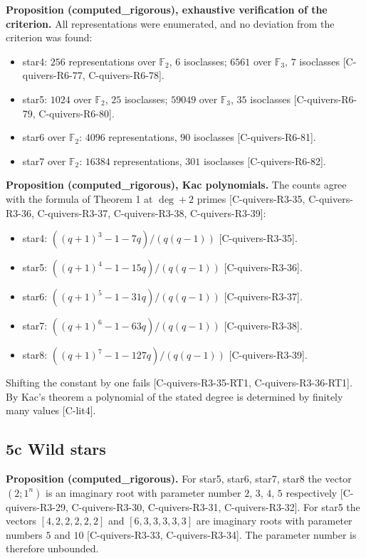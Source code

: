 \documentclass[10pt,twocolumn]{article}
\begin{document}
\textbf{Proposition (computed\_rigorous), exhaustive verification of the criterion.} All representations were enumerated, and no deviation from the criterion was found:
\begin{itemize}
\item star4: $256$ representations over $\mathbb F_2$, $6$ isoclasses; $6561$ over $\mathbb F_3$, $7$ isoclasses {\scriptsize[C-quivers-R6-77, C-quivers-R6-78]}.
\item star5: $1024$ over $\mathbb F_2$, $25$ isoclasses; $59049$ over $\mathbb F_3$, $35$ isoclasses {\scriptsize[C-quivers-R6-79, C-quivers-R6-80]}.
\item star6 over $\mathbb F_2$: $4096$ representations, $90$ isoclasses {\scriptsize[C-quivers-R6-81]}.
\item star7 over $\mathbb F_2$: $16384$ representations, $301$ isoclasses {\scriptsize[C-quivers-R6-82]}.
\end{itemize}

\textbf{Proposition (computed\_rigorous), Kac polynomials.} The counts agree with the formula of Theorem 1 at $\deg + 2$ primes {\scriptsize[C-quivers-R3-35, C-quivers-R3-36, C-quivers-R3-37, C-quivers-R3-38, C-quivers-R3-39]}:
\begin{itemize}
\item star4: $((q+1)^3 - 1 - 7q)/(q(q-1))$ {\scriptsize[C-quivers-R3-35]}.
\item star5: $((q+1)^4 - 1 - 15q)/(q(q-1))$ {\scriptsize[C-quivers-R3-36]}.
\item star6: $((q+1)^5 - 1 - 31q)/(q(q-1))$ {\scriptsize[C-quivers-R3-37]}.
\item star7: $((q+1)^6 - 1 - 63q)/(q(q-1))$ {\scriptsize[C-quivers-R3-38]}.
\item star8: $((q+1)^7 - 1 - 127q)/(q(q-1))$ {\scriptsize[C-quivers-R3-39]}.
\end{itemize}

Shifting the constant by one fails {\scriptsize[C-quivers-R3-35-RT1, C-quivers-R3-36-RT1]}. By Kac's theorem a polynomial of the stated degree is determined by finitely many values {\scriptsize[C-lit4]}.

\subsection*{5c Wild stars}

\textbf{Proposition (computed\_rigorous).} For star5, star6, star7, star8 the vector $(2;1^n)$ is an imaginary root with parameter number $2$, $3$, $4$, $5$ respectively {\scriptsize[C-quivers-R3-29, C-quivers-R3-30, C-quivers-R3-31, C-quivers-R3-32]}. For star5 the vectors $[4, 2, 2, 2, 2, 2]$ and $[6, 3, 3, 3, 3, 3]$ are imaginary roots with parameter numbers $5$ and $10$ {\scriptsize[C-quivers-R3-33, C-quivers-R3-34]}. The parameter number is therefore unbounded.
\end{document}
